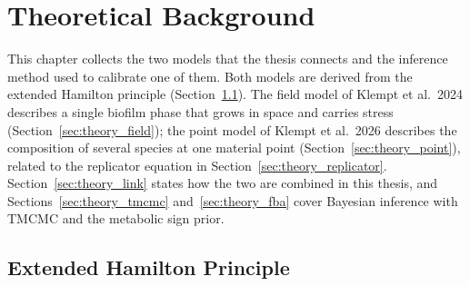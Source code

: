 \chapter{Theoretical Background}
\label{ch:theory}


This chapter collects the two models that the thesis connects and the
inference method used to calibrate one of them. Both models are derived from
the extended Hamilton principle (Section~\ref{sec:theory_hamilton}). The field
model of Klempt et al.\ 2024 describes a single biofilm phase that grows in
space and carries stress (Section~\ref{sec:theory_field}); the point model of
Klempt et al.\ 2026 describes the composition of several species at one
material point (Section~\ref{sec:theory_point}), related to the replicator
equation in Section~\ref{sec:theory_replicator}. Section~\ref{sec:theory_link}
states how the two are combined in this thesis, and
Sections~\ref{sec:theory_tmcmc} and~\ref{sec:theory_fba} cover Bayesian
inference with TMCMC and the metabolic sign prior.

\section{Extended Hamilton Principle}
\label{sec:theory_hamilton}

